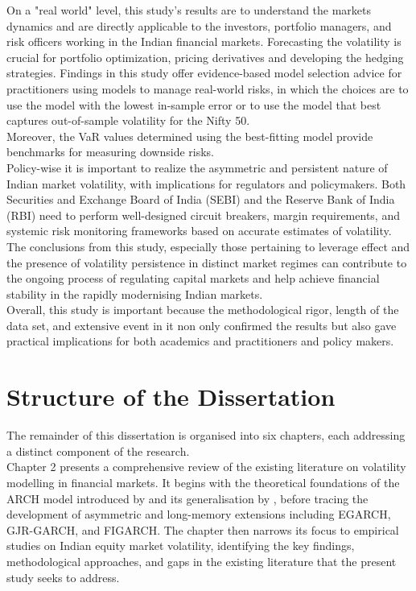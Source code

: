 On a "real world" level, this study's results are to understand the markets dynamics and are directly applicable to the investors, portfolio managers, and risk officers working in the Indian financial markets. Forecasting the volatility is crucial  for portfolio optimization, pricing derivatives and developing the hedging strategies. Findings in this study offer evidence-based model selection advice for practitioners using models to manage real-world risks, in which the choices are to use the model with the lowest in-sample error or to use the model that best captures out-of-sample volatility for the Nifty 50.\\

 Moreover, the VaR values determined using the best-fitting model provide benchmarks for measuring downside risks.\\


Policy-wise it is important to realize the asymmetric and persistent nature of Indian market volatility, with implications for regulators and policymakers. Both Securities and Exchange Board of India (SEBI) and the Reserve Bank of India (RBI) need to perform well-designed circuit breakers, margin requirements, and systemic risk monitoring frameworks based on accurate estimates of volatility. The conclusions from this study, especially those pertaining to leverage effect and the presence of volatility persistence in distinct market regimes can contribute to the ongoing process of regulating capital markets and help achieve financial stability in the rapidly modernising Indian markets.\\


Overall, this study is important because the methodological rigor, length of the data set, and extensive event in it non only confirmed the results but also gave practical implications for both academics and practitioners and policy makers.

\section{Structure of the Dissertation}
The remainder of this dissertation is organised into six chapters, each addressing a distinct component of the research.\\

Chapter 2 presents a comprehensive review of the existing literature on volatility modelling in financial markets. It begins with the theoretical foundations of the ARCH model introduced by \cite{engle1982} and its generalisation by \cite{bollerslev1986}, before tracing the development of asymmetric and long-memory extensions including EGARCH, GJR-GARCH, and FIGARCH. The chapter then narrows its focus to empirical studies on Indian equity market volatility, identifying the key findings, methodological approaches, and gaps in the existing literature that the present study seeks to address.\\


